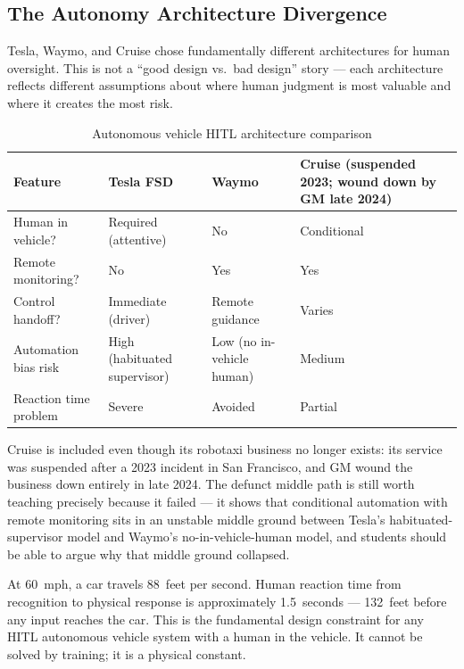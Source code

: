 \subsection{The Autonomy Architecture Divergence}

Tesla, Waymo, and Cruise chose fundamentally different architectures for human oversight. This is not a ``good design vs.\ bad design'' story --- each architecture reflects different assumptions about where human judgment is most valuable and where it creates the most risk.

\begin{table}[htbp]
\caption{Autonomous vehicle HITL architecture comparison}
\label{tab:av-architectures}
\centering
\begin{tabular}{@{}p{2.8cm}p{2.5cm}p{2.5cm}p{2.5cm}@{}}
\toprule
\textbf{Feature} & \textbf{Tesla FSD} & \textbf{Waymo} & \textbf{Cruise (suspended 2023; wound down by GM late 2024)} \\
\midrule
Human in vehicle? & Required (attentive) & No & Conditional \\
Remote monitoring? & No & Yes & Yes \\
Control handoff? & Immediate (driver) & Remote guidance & Varies \\
Automation bias risk & High (habituated supervisor) & Low (no in-vehicle human) & Medium \\
Reaction time problem & Severe & Avoided & Partial \\
\bottomrule
\end{tabular}
\end{table}

\begin{technote}
Cruise is included even though its robotaxi business no longer exists: its service was suspended after a 2023 incident in San Francisco, and GM wound the business down entirely in late 2024. The defunct middle path is still worth teaching precisely because it failed --- it shows that conditional automation with remote monitoring sits in an unstable middle ground between Tesla's habituated-supervisor model and Waymo's no-in-vehicle-human model, and students should be able to argue why that middle ground collapsed.
\end{technote}

\begin{cautionbox}
At 60~mph, a car travels 88~feet per second. Human reaction time from recognition to physical response is approximately 1.5~seconds --- 132~feet before any input reaches the car. This is the fundamental design constraint for any HITL autonomous vehicle system with a human in the vehicle. It cannot be solved by training; it is a physical constant.
\end{cautionbox}


